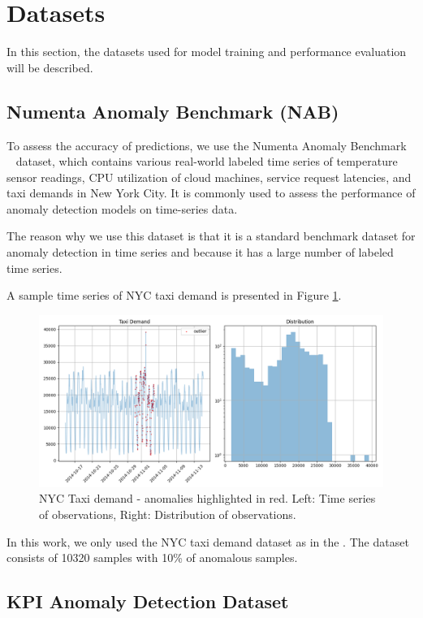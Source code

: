 \documentclass[a4paper, twoside]{report}
\theoremstyle{definition}
\numberwithin{equation}{section}
\begin{document}
\section{Datasets} \label{sec:datasets}

In this section, the datasets used for model training and performance evaluation will be described.

\subsection{Numenta Anomaly Benchmark (NAB)}
To assess the accuracy of predictions, we use the Numenta Anomaly Benchmark ~\cite{Ahmad2017Unsupervised} dataset,
which contains various real-world labeled time series of temperature sensor readings, CPU utilization of cloud machines, service
request latencies, and taxi demands in New York City. It is commonly used to assess the performance of anomaly detection
models on time-series data.

The reason why we use this dataset is that it is a standard benchmark dataset
for anomaly detection in time series and because it has a large number of labeled time series.

A sample time series of NYC taxi demand is presented in Figure \ref{fig:NAB_example_nyc_taxi}.
\begin{figure}[h!]
    \centering
    \includegraphics[width=\textwidth]{NAB_example_nyc_taxi.png}
    \caption{NYC Taxi demand - anomalies highlighted in red. Left: Time series of observations, Right: Distribution of observations.}
    \label{fig:NAB_example_nyc_taxi}
\end{figure}

In this work, we only used the NYC taxi demand dataset as in the \cite{tuli2022tranad}.
The dataset consists of 10320 samples with 10\% of anomalous samples.

\subsection{KPI Anomaly Detection Dataset}
\end{document}
